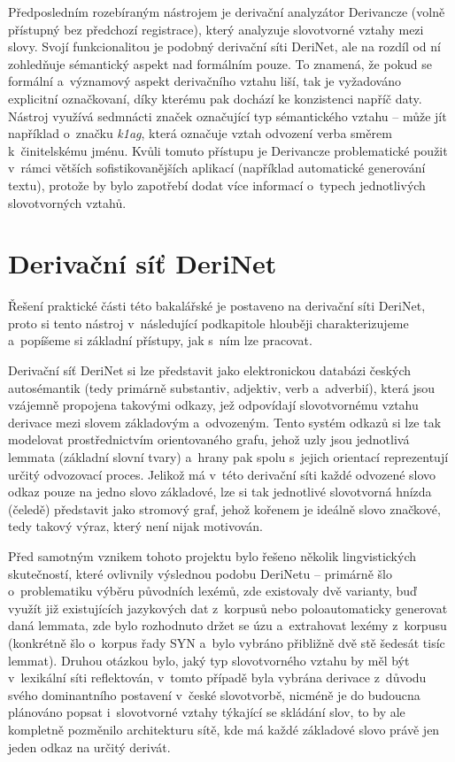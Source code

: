 Předposledním rozebíraným nástrojem je derivační analyzátor Derivancze
(volně přístupný bez předchozí registrace), který analyzuje slovotvorné
vztahy mezi slovy. Svojí funkcionalitou je podobný derivační síti
DeriNet, ale na rozdíl od ní zohledňuje sémantický aspekt nad formálním
pouze. To znamená, že pokud se formální a~významový aspekt derivačního
vztahu liší, tak je vyžadováno explicitní označkovaní, díky kterému pak
dochází ke konzistenci napříč daty. Nástroj využívá sedmnácti značek
označující typ sémantického vztahu -- může jít například o~značku
\emph{k1ag}, která označuje vztah odvození verba směrem k~činitelskému
jménu. Kvůli tomuto přístupu je Derivancze problematické použit v~rámci
větších sofistikovanějších aplikací (například automatické generování
textu), protože by bylo zapotřebí dodat více informací o~typech
jednotlivých slovotvorných vztahů.~\parencite{derivancze}

\hypertarget{derivaux10dnuxed-suxedux165-derinet}{%
\section{Derivační síť
DeriNet}\label{derivaux10dnuxed-suxedux165-derinet}}

Řešení praktické části této bakalářské je postaveno na derivační síti
DeriNet, proto si tento nástroj v~následující podkapitole hlouběji
charakterizujeme a~popíšeme si základní přístupy, jak s~ním lze
pracovat.

Derivační síť DeriNet si lze představit jako elektronickou databázi
českých autosémantik (tedy primárně substantiv, adjektiv, verb
a~adverbií), která jsou vzájemně propojena takovými odkazy, jež odpovídají
slovotvornému vztahu derivace mezi slovem základovým a~odvozeným. Tento
systém odkazů si lze tak modelovat prostřednictvím orientovaného grafu,
jehož uzly jsou jednotlivá lemmata (základní slovní tvary) a~hrany pak
spolu s~jejich orientací reprezentují určitý odvozovací proces. Jelikož
má v~této derivační síti každé odvozené slovo odkaz pouze na jedno slovo
základové, lze si tak jednotlivé slovotvorná hnízda (čeledě) představit
jako stromový graf, jehož kořenem je ideálně slovo značkové, tedy takový
výraz, který není nijak motivován.~\parencite{derinet-cz}

Před samotným vznikem tohoto projektu bylo řešeno několik lingvistických
skutečností, které ovlivnily výslednou podobu DeriNetu -- primárně šlo
o~problematiku výběru původních lexémů, zde existovaly dvě varianty, buď
využít již existujících jazykových dat z~korpusů nebo poloautomaticky
generovat daná lemmata, zde bylo rozhodnuto držet se úzu a~extrahovat
lexémy z~korpusu (konkrétně šlo o~korpus řady SYN a~bylo vybráno
přibližně dvě stě šedesát tisíc lemmat). Druhou otázkou bylo, jaký typ
slovotvorného vztahu by měl být v~lexikální síti reflektován, v~tomto
případě byla vybrána derivace z~důvodu svého dominantního postavení
v~české slovotvorbě, nicméně je do budoucna plánováno popsat i~slovotvorné
vztahy týkající se skládání slov, to by ale kompletně pozměnilo
architekturu sítě, kde má každé základové slovo právě jen jeden odkaz na
určitý derivát.~\parencite{sevcikova14}

